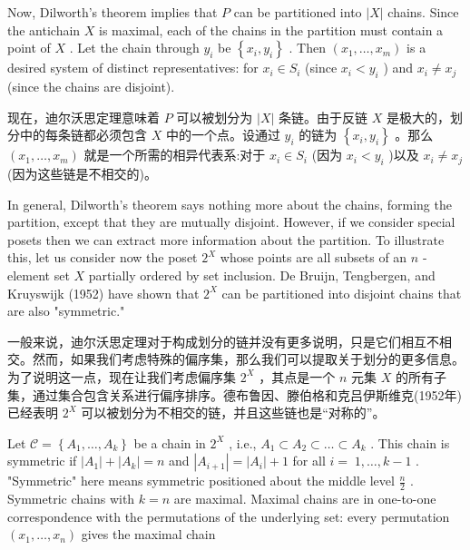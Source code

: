 \documentclass[10pt]{article}
\begin{document}
Now, Dilworth’s theorem implies that \(P\) can be partitioned into \(\left| X\right|\) chains. Since the antichain \(X\) is maximal, each of the chains in the partition must contain a point of \(X\) . Let the chain through \({y}_{i}\) be \(\left\{  {{x}_{i},{y}_{i}}\right\}\) . Then \(\left( {{x}_{1},\ldots ,{x}_{m}}\right)\) is a desired system of distinct representatives: for \({x}_{i} \in  {S}_{i}\) (since \({x}_{i} < {y}_{i}\) ) and \({x}_{i} \neq  {x}_{j}\) (since the chains are disjoint).

\begin{tcolorbox}\relax
现在，迪尔沃思定理意味着 \(P\) 可以被划分为 \(\left| X\right|\) 条链。由于反链 \(X\) 是极大的，划分中的每条链都必须包含 \(X\) 中的一个点。设通过 \({y}_{i}\) 的链为 \(\left\{  {{x}_{i},{y}_{i}}\right\}\) 。那么 \(\left( {{x}_{1},\ldots ,{x}_{m}}\right)\) 就是一个所需的相异代表系:对于 \({x}_{i} \in  {S}_{i}\) (因为 \({x}_{i} < {y}_{i}\) )以及 \({x}_{i} \neq  {x}_{j}\) (因为这些链是不相交的)。
\end{tcolorbox}

In general, Dilworth's theorem says nothing more about the chains, forming the partition, except that they are mutually disjoint. However, if we consider special posets then we can extract more information about the partition. To illustrate this, let us consider now the poset \({2}^{X}\) whose points are all subsets of an \(n\) -element set \(X\) partially ordered by set inclusion. De Bruijn, Tengbergen, and Kruyswijk (1952) have shown that \({2}^{X}\) can be partitioned into disjoint chains that are also "symmetric."

\begin{tcolorbox}\relax
一般来说，迪尔沃思定理对于构成划分的链并没有更多说明，只是它们相互不相交。然而，如果我们考虑特殊的偏序集，那么我们可以提取关于划分的更多信息。为了说明这一点，现在让我们考虑偏序集 \({2}^{X}\) ，其点是一个 \(n\) 元集 \(X\) 的所有子集，通过集合包含关系进行偏序排序。德布鲁因、滕伯格和克吕伊斯维克(1952年)已经表明 \({2}^{X}\) 可以被划分为不相交的链，并且这些链也是“对称的”。
\end{tcolorbox}

Let \(\mathcal{C} = \left\{  {{A}_{1},\ldots ,{A}_{k}}\right\}\) be a chain in \({2}^{X}\) , i.e., \({A}_{1} \subset  {A}_{2} \subset  \ldots  \subset  {A}_{k}\) . This chain is symmetric if \(\left| {A}_{1}\right|  + \left| {A}_{k}\right|  = n\) and \(\left| {A}_{i + 1}\right|  = \left| {A}_{i}\right|  + 1\) for all \(i = \; 1,\ldots ,k - 1\) . "Symmetric" here means symmetric positioned about the middle level \(\frac{n}{2}\) . Symmetric chains with \(k = n\) are maximal. Maximal chains are in one-to-one correspondence with the permutations of the underlying set: every permutation \(\left( {{x}_{1},\ldots ,{x}_{n}}\right)\) gives the maximal chain
\end{document}
